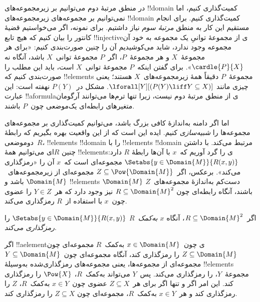 \documentclass[../../../include/open-logic-section]{subfiles}
\begin{document}


\begin{explain}
در منطق مرتبهٔ دوم می‌توانیم بر زیرمجموعه‌های !!{domain} کمیت‌گذاری
کنیم، اما نمی‌توانیم بر مجموعه‌های زیرمجموعه‌های !!{domain} کمیت‌گذاری
کنیم. برای انجام مستقیم این کار به منطق \emph{مرتبهٔ سوم} نیاز داشتیم.
برای نمونه، اگر می‌خواستیم قضیهٔ کانتور را بیان کنیم که هیچ تابع
!!{injective}ی از مجموعهٔ توانیِ یک مجموعه به خود آن مجموعه وجود ندارد،
شاید می‌کوشیدیم آن را چنین صورت‌بندی کنیم: «برای هر مجموعهٔ~$X$ و هر
مجموعهٔ~$P$، اگر~$P$ مجموعهٔ توانی~$X$ باشد، آنگاه نه
$\cardle{P}{X}$». برای گفتن اینکه~$P$ مجموعهٔ توانی~$X$ است، باید این
مطلب را صورت‌بندی کنیم که !!{element}s مجموعهٔ~$P$ دقیقاً همهٔ
زیرمجموعه‌های~$X$ هستند؛ یعنی چیزی مانند
$\lforall[Y][(P(Y) \liff Y \subseteq X)]$. مشکل در~$P(Y)$ نهفته است:
این عبارت !!a{formula}ی از منطق مرتبهٔ دوم نیست، زیرا تنها ترم‌ها می‌توانند
آرگومان متغیرهای رابطه‌ای یک‌موضعی چون~$P$ باشند.

اما اگر دامنه به‌اندازهٔ کافی بزرگ باشد، می‌توانیم کمیت‌گذاری بر
مجموعه‌های مجموعه‌ها را \emph{شبیه‌سازی} کنیم. ایده این است که از این
واقعیت بهره بگیریم که رابطهٔ دو‌موضعی~$R$، !!{element}s
!!{domain} را با !!{element}s !!{domain} مرتبط می‌کند. با داشتن چنین
$R$ای می‌توانیم همهٔ !!{element}sی را گرد آوریم که~$x$ با آن‌ها رابطهٔ
$R$ دارد: $\Setabs{y \in \Domain{M}}{R(x,y)}$ مجموعه‌ای است که~$x$ آن
را «رمزگذاری می‌کند». برعکس، اگر~$Z \subseteq \Pow{\Domain{M}}$
مجموعه‌ای از زیرمجموعه‌های~$\Domain{M}$ باشد و !!{element}s
$\Domain{M}$ دست‌کم به‌اندازهٔ مجموعه‌های~$Z$ باشند، آنگاه رابطه‌ای چون
$R \subseteq \Domain{M}^2$ نیز وجود دارد که هر~$Y \in Z$ را عضوی
چون~$x$ با استفاده از~$R$ رمزگذاری می‌کند.
\end{explain}

\begin{defn}
اگر~$R \subseteq \Domain{M}^2$، آنگاه \emph{$x$ به‌کمک~$R$}
$\Setabs{y \in \Domain{M}}{R(x, y)}$ را \emph{رمزگذاری می‌کند}.
\end{defn}

اگر !!a{element}ی چون~$x \in \Domain{M}$ به‌کمک~$R$ مجموعه‌ای چون
  $Z \subseteq \Domain{M}$ را رمزگذاری کند، آنگاه مجموعه‌ای
چون~$Y \subseteq \Domain{M}$ مجموعه‌ای از مجموعه‌ها، یعنی مجموعه‌های
رمزگذاری‌شده به‌وسیلهٔ !!{element}s مجموعهٔ~$Y$، را رمزگذاری می‌کند.
پس~$Y$ می‌تواند به‌کمک~$R$، $\Pow{X}$ را رمزگذاری کند. این امر اگر و
تنها اگر برای هر~$Z \subseteq X$ عضوی چون~$x \in Y$ به‌کمک~$R$، $Z$
را رمزگذاری کند و هر~$x \in Y$ به‌کمک~$R$، مجموعه‌ای چون
$Z \subseteq X$ را رمزگذاری کند.
\end{document}
